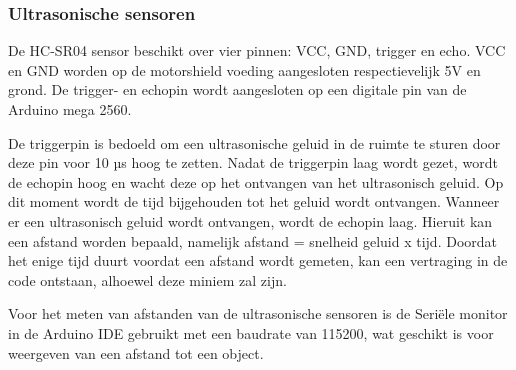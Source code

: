 \subsubsection{Ultrasonische sensoren}
De HC-SR04 sensor beschikt over vier pinnen: VCC, GND, trigger en echo. VCC en GND worden op de motorshield voeding aangesloten respectievelijk 5V en grond. De trigger- en echopin wordt aangesloten op een digitale pin van de Arduino mega 2560\cite{HC-SR04}.

De triggerpin is bedoeld om een ultrasonische geluid in de ruimte te sturen door deze pin voor 10 µs hoog te zetten. Nadat de triggerpin laag wordt gezet, wordt de echopin hoog en wacht deze op het ontvangen van het ultrasonisch geluid. Op dit moment wordt de tijd bijgehouden tot het geluid wordt ontvangen. Wanneer er een ultrasonisch geluid wordt ontvangen, wordt de echopin laag. Hieruit kan een afstand worden bepaald, namelijk afstand = snelheid geluid x tijd. Doordat het enige tijd duurt voordat een afstand wordt gemeten, kan een vertraging in de code ontstaan, alhoewel deze miniem zal zijn.

Voor het meten van afstanden van de ultrasonische sensoren is de Seriële monitor  in de Arduino IDE gebruikt met een baudrate van 115200, wat geschikt is voor weergeven van  een afstand tot een object.

